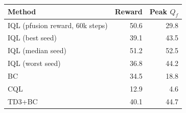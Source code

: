 \begin{tabular}{lrr}
\toprule
Method & Reward & Peak $Q_f$ \\
\midrule
IQL (pfusion reward, 60k steps) & 50.6 & 29.8 \\
IQL (best seed) & 39.1 & 43.5 \\
IQL (median seed) & 51.2 & 52.5 \\
IQL (worst seed) & 36.8 & 44.2 \\
BC & 34.5 & 18.8 \\
CQL & 12.9 & 4.6 \\
TD3+BC & 40.1 & 44.7 \\
\bottomrule
\end{tabular}
